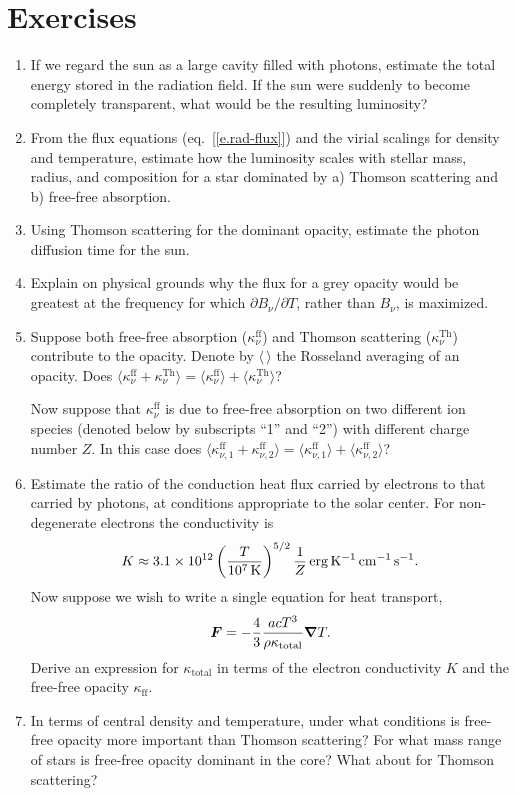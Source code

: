 \section{Exercises}
\begin{enumerate}
\item If we regard the sun as a large cavity filled with photons, estimate the total energy stored in the radiation field.  If the sun were suddenly to become completely transparent, what would be the resulting luminosity?

\item From the flux equations (eq.~[\ref{e.rad-flux}]) and the virial scalings for density and temperature, estimate how the luminosity scales with stellar mass, radius, and composition for a star dominated by a) Thomson scattering and b) free-free absorption.

\item Using Thomson scattering for the dominant opacity, estimate the photon diffusion time for the sun. 

\item Explain on physical grounds why the flux for a grey opacity would be greatest at the frequency for which $\partial B_{\nu}/\partial T$, rather than $B_{\nu}$, is maximized.

\item Suppose both free-free absorption ($\kappa^{\mathrm{ff}}_{\nu}$) and Thomson scattering ($\kappa^{\mathrm{Th}}_{\nu}$) contribute to the opacity. Denote by $\langle\,\rangle$ the Rosseland averaging of an opacity.  Does $\langle \kappa^{\mathrm{ff}}_{\nu} + \kappa^{\mathrm{Th}}_{\nu}\rangle = \langle\kappa^{\mathrm{ff}}_{\nu}\rangle+\langle\kappa^{\mathrm{Th}}_{\nu}\rangle$? 

Now suppose that $\kappa^{\mathrm{ff}}_{\nu}$ is due to free-free absorption on two different ion species (denoted below by subscripts ``1'' and ``2'') with different charge number $Z$.  In this case does $\langle \kappa^{\mathrm{ff}}_{\nu,1} + \kappa^{\mathrm{ff}}_{\nu,2}\rangle = \langle\kappa^{\mathrm{ff}}_{\nu,1}\rangle+\langle\kappa^{\mathrm{ff}}_{\nu,2}\rangle$?

\item Estimate the ratio of the conduction heat flux carried by electrons to that carried by photons, at conditions appropriate to the solar center.  For non-degenerate electrons the conductivity is \citep{spitzer62:_physic}
\[
K \approx 3.1\times 10^{12}  \left(\frac{T}{10^{7}\,\mathrm{K}}\right)^{5/2}\frac{1}{Z}\,\mathrm{erg}\,\mathrm{K}^{-1}\,\mathrm{c}\mathrm{m}^{-1}\,\mathrm{s}^{-1}.
\]
Now suppose we wish to write a single equation for heat transport,
\[
\boldsymbol{F} =  -\frac{4}{3} \frac{acT^{3}}{\rho\kappa_{\mathrm{total}}}\boldsymbol{\nabla} T.
 \]
Derive an expression for $\kappa_{\mathrm{total}}$ in terms of the electron conductivity $K$ and the free-free opacity $\kappa_{\mathrm{ff}}$.  

\item In terms of central density and temperature, under what conditions is free-free opacity more important than Thomson scattering?  For what mass range of stars is free-free opacity dominant in the core? What about for Thomson scattering?

\end{enumerate}
